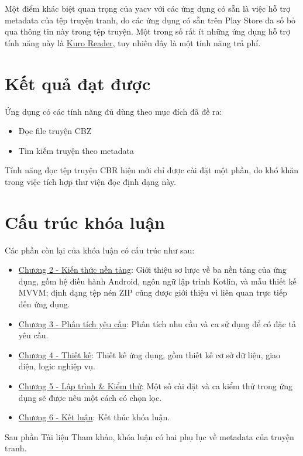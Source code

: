 \documentclass[../../thesis]{subfiles}
\begin{document}
Một điểm khác biệt quan trọng của yacv với các ứng dụng có sẵn là việc hỗ trợ
metadata của tệp truyện tranh, do các ứng dụng có sẵn trên Play Store đa số bỏ
qua thông tin này trong tệp truyện. Một trong số rất ít những ứng dụng hỗ trợ
tính năng này là \href{\KuroReader}{Kuro Reader}, tuy nhiên đây là một tính năng
trả phí.



\section{Kết quả đạt được}\label{sec:resulted-app}

Ứng dụng có các tính năng đủ dùng theo mục đích đã đề ra:

\begin{itemize}
    \item
        Đọc file truyện CBZ
    \item
        Tìm kiếm truyện theo metadata
\end{itemize}

Tính năng đọc tệp truyện CBR hiện mới chỉ được cài đặt một phần, do khó khăn
trong việc tích hợp thư viện đọc định dạng này.



\section{Cấu trúc khóa luận}\label{sec:outline}

Các phần còn lại của khóa luận có cấu trúc như sau:

\begin{itemize}
    \item
        \hyperref[chap:fundamental]{Chương 2 - Kiến thức nền tảng}: Giới thiệu
        sơ lược về ba nền tảng của ứng dụng, gồm hệ điều hành Android, ngôn ngữ
        lập trình Kotlin, và mẫu thiết kế MVVM; định dạng tệp nén ZIP cũng được
        giới thiệu vì liên quan trực tiếp đến ứng dụng.
    \item
        \hyperref[chap:requirements]{Chương 3 - Phân tích yêu cầu}: Phân tích
        nhu cầu và ca sử dụng để có đặc tả yêu cầu.
    \item
        \protect\hyperlink{P4-design}{Chương 4 - Thiết kế}: Thiết kế ứng dụng,
        gồm thiết kế cơ sở dữ liệu, giao diện, logic nghiệp vụ.
    \item
        \protect\hyperlink{P5-implementation}{Chương 5 - Lập trình \& Kiểm thử}:
        Một số cài đặt và ca kiểm thử trong ứng dụng sẽ được nêu một cách có
        chọn lọc.
    \item
        \protect\hyperlink{P6-comclusion}{Chương 6 - Kết luận}: Kết thúc khóa
        luận.
\end{itemize}

Sau phần Tài liệu Tham khảo, khóa luận có hai phụ lục về metadata của truyện
tranh.
\end{document}
